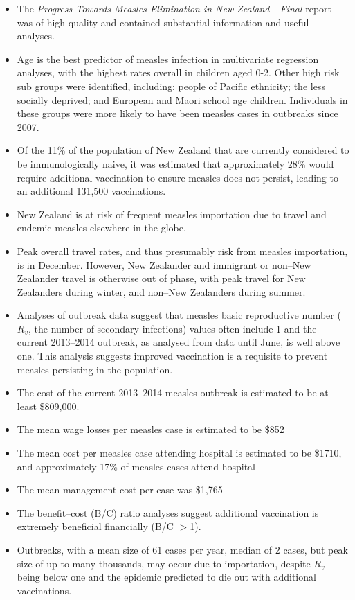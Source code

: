 \documentclass{article}
\begin{document}
\begin{itemize}
\item The \emph {Progress Towards Measles Elimination in New Zealand - Final} report was of high quality and contained substantial information and useful analyses.
\item Age is the best predictor of measles infection in multivariate regression analyses, with the highest rates overall in children aged 0-2. Other high risk sub groups were identified, including:  people of Pacific ethnicity; the less socially deprived; and European and Maori school age children. Individuals in these groups were more likely to have been measles cases in outbreaks since 2007.
\item Of the 11\% of the population of New Zealand that are currently considered to be immunologically naive, it was estimated that approximately 28\% would require additional vaccination to ensure measles does not persist, leading to an additional 131,500 vaccinations.
\item New Zealand is at risk of frequent measles importation due to travel and endemic measles elsewhere in the globe.
\item Peak overall travel rates, and thus presumably risk from measles importation, is in December. However, New Zealander and immigrant or non--New Zealander travel is otherwise out of phase, with peak travel for New Zealanders during winter, and non--New Zealanders during summer.
\item Analyses of outbreak data suggest that measles basic reproductive number ($R_v$, the number of secondary infections) values often include 1 and the current 2013--2014 outbreak, as analysed from data until June, is well above one. This analysis suggests improved vaccination is a requisite to prevent measles persisting in the population.
\item The cost of the current 2013--2014 measles outbreak is estimated to be at least \$809,000.
\item The mean wage losses per measles case is estimated to be \$852
\item The mean cost per measles case attending hospital is estimated to be \$1710, and approximately 17\% of measles cases attend hospital
\item The mean management cost per case was \$1,765
\item The benefit--cost (B/C) ratio analyses suggest additional vaccination is extremely beneficial financially (B/C $>$1).
\item Outbreaks, with a mean size of 61 cases per year, median of 2 cases, but peak size of up to many thousands, may occur due to importation, despite $R_v$ being below one and the epidemic predicted to die out with additional vaccinations.
\end{itemize}
\end{document}
